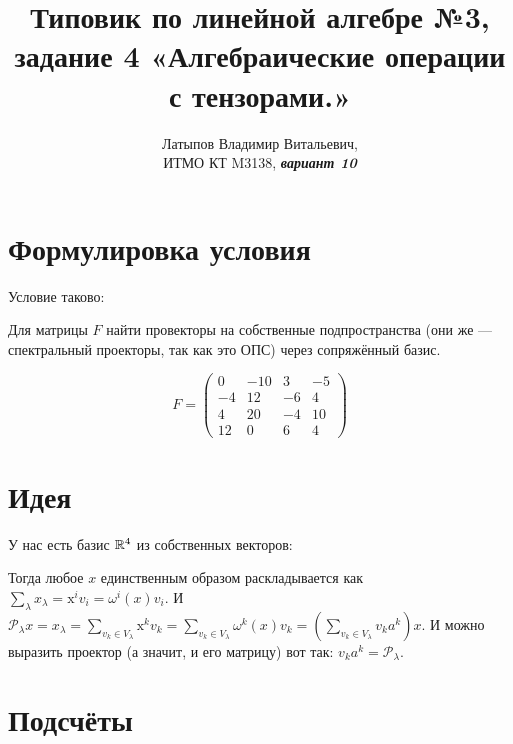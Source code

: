 \documentclass[12pt, a4paper]{article}
\author{Латыпов Владимир Витальевич, \\ ИТМО КТ M3138, \Huge{\textit{\textbf{вариант 10}}}}
\title{Типовик по линейной алгебре №3, задание 4 «Алгебраические операции с тензорами.»}
\begin{document}
    \tit

    \section{Формулировка условия}

    \begin{statement}
        Условие таково:

        Для матрицы $F$ найти провекторы на собственные подпространства 
        (они же — спектральный проекторы, так как это ОПС) через сопряжённый базис.

        \begin{equation}
            F = \left(\begin{matrix}
                0 & -10 & 3 & -5 \\
                -4 & 12 & -6 & 4 \\
                4 & 20 & -4 & 10 \\
                12 & 0 & 6 & 4
            \end{matrix}\right)
        \end{equation}

    \end{statement}


    \section{Идея}

    У нас есть базис ${\mathbb{R}}^4$ из собственных векторов:

    Тогда любое $x$ единственным образом раскладывается как $\sum\limits_\lambda x_\lambda=\mathrm x^iv_i=\omega^i(x)v_i$. 
    И $\mathcal{P}_\lambda x=x_\lambda=\sum\limits_{v_k\in V_\lambda}\mathrm x^kv_k=\sum\limits_{v_k\in V_\lambda}\omega^k(x)v_k=\left(\sum\limits_{v_k\in V_\lambda}v_ka^k\right)x$. 
    И можно выразить проектор (а значит, и его матрицу) вот так: $v_ka^k=\mathcal{P}_\lambda$.


    \section{Подсчёты}
\end{document}
